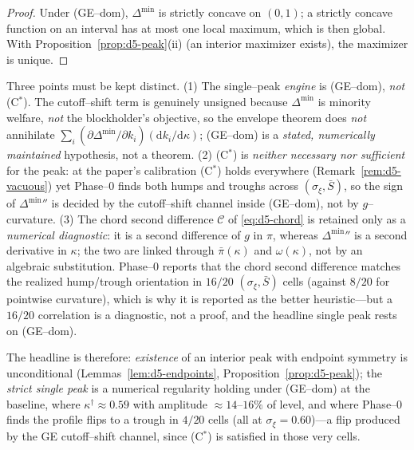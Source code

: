 \begin{proof}
Under (GE--dom), $\Delta^{\min}$ is strictly concave on $(0,1)$; a strictly
concave function on an interval has at most one local maximum, which is then
global. With Proposition~\ref{prop:d5-peak}(ii) (an interior maximizer exists),
the maximizer is unique.
\end{proof}

\begin{remark}\label{rem:d5-conditional}
Three points must be kept distinct. (1) The single--peak \emph{engine} is
(GE--dom), \emph{not} (C$^\ast$). The cutoff--shift term is genuinely unsigned
because $\Delta^{\min}$ is minority welfare, \emph{not} the blockholder's
objective, so the envelope theorem does \emph{not} annihilate
$\sum_i(\partial\Delta^{\min}/\partial k_i)(\mathrm d k_i/\mathrm d\kappa)$;
(GE--dom) is a \emph{stated, numerically maintained} hypothesis, not a theorem.
(2) (C$^\ast$) is \emph{neither necessary nor sufficient} for the peak: at the
paper's calibration (C$^\ast$) holds everywhere (Remark~\ref{rem:d5-vacuous})
yet Phase--0 finds both humps and troughs across $(\sigma_\xi,\bar S)$, so the
sign of $\Delta^{\min}{}''$ is decided by the cutoff--shift channel inside
(GE--dom), not by $g$--curvature. (3) The chord second difference $\mathcal C$
of \eqref{eq:d5-chord} is retained only as a \emph{numerical diagnostic}: it is
a second difference of $g$ in $\pi$, whereas $\Delta^{\min}{}''$ is a second
derivative in $\kappa$; the two are linked through $\bar\pi(\kappa)$ and
$\omega(\kappa)$, not by an algebraic substitution. Phase--0 reports that the
chord second difference matches the realized hump/trough orientation in $16/20$
$(\sigma_\xi,\bar S)$ cells (against $8/20$ for pointwise curvature), which is
why it is reported as the better heuristic---but a $16/20$ correlation is a
diagnostic, not a proof, and the headline single peak rests on (GE--dom).

The headline is therefore: \emph{existence} of an interior peak with endpoint
symmetry is unconditional (Lemmas~\ref{lem:d5-endpoints},
Proposition~\ref{prop:d5-peak}); the \emph{strict single peak} is a numerical
regularity holding under (GE--dom) at the baseline, where
$\kappa^{\dagger}\approx0.59$ with amplitude $\approx14$--$16\%$ of level, and
where Phase--0 finds the profile flips to a trough in $4/20$ cells (all at
$\sigma_\xi=0.60$)---a flip produced by the GE cutoff--shift channel, since
(C$^\ast$) is satisfied in those very cells. %
\end{remark}

